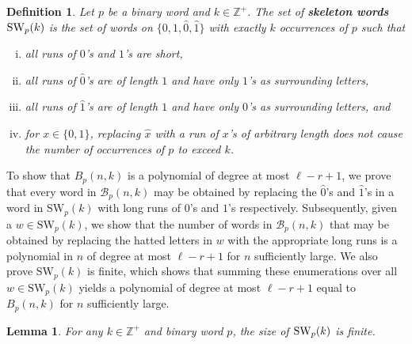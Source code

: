 \documentclass[11pt]{amsart}
\newtheorem{lemma}[theorem]{Lemma}
\newtheorem{definition}[theorem]{Definition}
\newcommand{\ZZ}{\mathbb{Z}}
\newcommand{\hatted}[1]{\widehat{#1}}
\begin{document}
\begin{definition}\label{SW_def}
    Let $p$ be a binary word and $k\in\ZZ^+$. The set of \textbf{skeleton words} $\text{\normalfont SW}_p(k)$ is the set of words on $\{0,1,\hatted{0},\hatted{1}\}$ with exactly $k$ occurrences of $p$ such that
    \begin{enumerate}[(i)]
        \item\label{property_1} all runs of $0$'s and $1$'s are short,
        \item\label{property_2} all runs of $\hatted{0}$'s are of length $1$ and have only $1$'s as surrounding letters,
        \item\label{property_3} all runs of $\hatted{1}$'s are of length $1$ and have only $0$'s as surrounding letters, and
        \item\label{property_4} for $x\in\{0,1\}$, replacing $\hatted{x}$ with a run of $x$'s of arbitrary length does not cause the number of occurrences of $p$ to exceed $k$.
    \end{enumerate}
    
    
\end{definition}

To show that $B_p(n,k)$ is a polynomial of degree at most $\ell-r+1$, we prove that every word in $\mathcal{B}_p(n,k)$ may be obtained by replacing the $\hatted{0}$'s and $\hatted{1}$'s in a word in $\text{SW}_p(k)$ with long runs of $0$'s and $1$'s respectively. Subsequently, given a $w\in\text{SW}_p(k)$, we show that the number of words in $\mathcal{B}_p(n,k)$ that may be obtained by replacing the hatted letters in $w$ with the appropriate long runs is a polynomial in $n$ of degree at most $\ell-r+1$ for $n$ sufficiently large. We also prove $\text{SW}_p(k)$ is finite, which shows that summing these enumerations over all $w\in\text{SW}_p(k)$ yields a polynomial of degree at most $\ell-r+1$ equal to $B_p(n,k)$ for $n$ sufficiently large.



\begin{lemma}\label{short_words_constant_in_n}
    For any $k\in\ZZ^+$ and binary word $p$, the size of $\text{\normalfont SW}_p(k)$ is finite.
\end{lemma}
\end{document}
